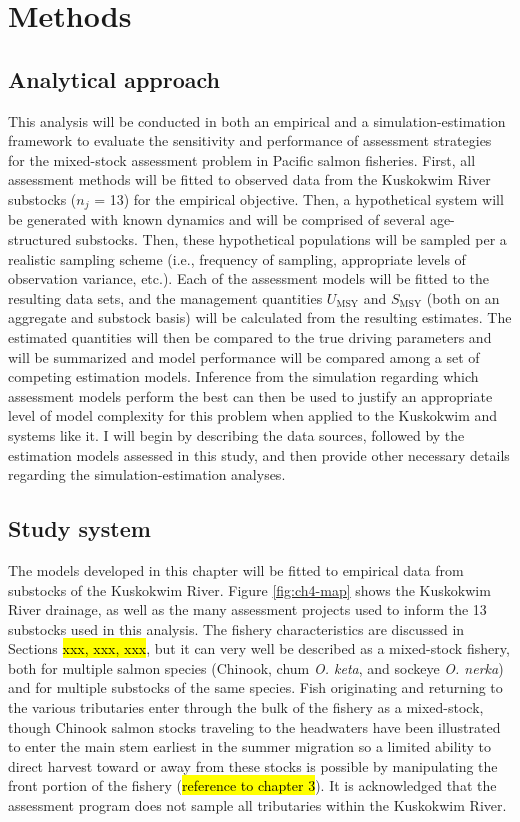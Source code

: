 \documentclass[12pt,]{book}
\theoremstyle{definition}
\theoremstyle{definition}
\theoremstyle{definition}
\theoremstyle{remark}
\begin{document}
\section{Methods}\label{methods}

\subsection{Analytical approach}\label{analytical-approach}

This analysis will be conducted in both an empirical and a
simulation-estimation framework to evaluate the sensitivity and
performance of assessment strategies for the mixed-stock assessment
problem in Pacific salmon fisheries. First, all assessment methods will
be fitted to observed data from the Kuskokwim River substocks (\(n_j\) =
13) for the empirical objective. Then, a hypothetical system will be
generated with known dynamics and will be comprised of several
age-structured substocks. Then, these hypothetical populations will be
sampled per a realistic sampling scheme (i.e., frequency of sampling,
appropriate levels of observation variance, etc.). Each of the
assessment models will be fitted to the resulting data sets, and the
management quantities \(U_{\text{MSY}}\) and \(S_{\text{MSY}}\) (both on
an aggregate and substock basis) will be calculated from the resulting
estimates. The estimated quantities will then be compared to the true
driving parameters and will be summarized and model performance will be
compared among a set of competing estimation models. Inference from the
simulation regarding which assessment models perform the best can then
be used to justify an appropriate level of model complexity for this
problem when applied to the Kuskokwim and systems like it. I will begin
by describing the data sources, followed by the estimation models
assessed in this study, and then provide other necessary details
regarding the simulation-estimation analyses.

\subsection{Study system}\label{study-system}

The models developed in this chapter will be fitted to empirical data
from substocks of the Kuskokwim River. Figure \ref{fig:ch4-map} shows
the Kuskokwim River drainage, as well as the many assessment projects
used to inform the 13 substocks used in this analysis. The fishery
characteristics are discussed in Sections \hl{xxx, xxx, xxx}, but it can
very well be described as a mixed-stock fishery, both for multiple
salmon species (Chinook, chum \emph{O. keta}, and sockeye \emph{O.
nerka}) and for multiple substocks of the same species. Fish originating
and returning to the various tributaries enter through the bulk of the
fishery as a mixed-stock, though Chinook salmon stocks traveling to the
headwaters have been illustrated to enter the main stem earliest in the
summer migration \citep{smith-liller-2017} so a limited ability to
direct harvest toward or away from these stocks is possible by
manipulating the front portion of the fishery
(\hl{reference to chapter 3}). It is acknowledged that the assessment
program does not sample all tributaries within the Kuskokwim River.
\end{document}
